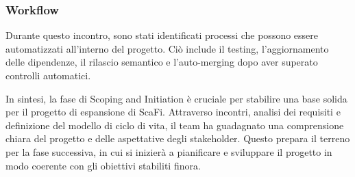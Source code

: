 \subsubsection{Workflow}
Durante questo incontro, sono stati identificati processi che possono essere automatizzati all'interno del progetto. Ciò include il testing, l'aggiornamento delle dipendenze, il rilascio semantico e l'auto-merging dopo aver superato controlli automatici.

In sintesi, la fase di Scoping and Initiation è cruciale per stabilire una base solida per il progetto di espansione di ScaFi. Attraverso incontri, analisi dei requisiti e definizione del modello di ciclo di vita, il team ha guadagnato una comprensione chiara del progetto e delle aspettative degli stakeholder. Questo prepara il terreno per la fase successiva, in cui si inizierà a pianificare e sviluppare il progetto in modo coerente con gli obiettivi stabiliti finora.
